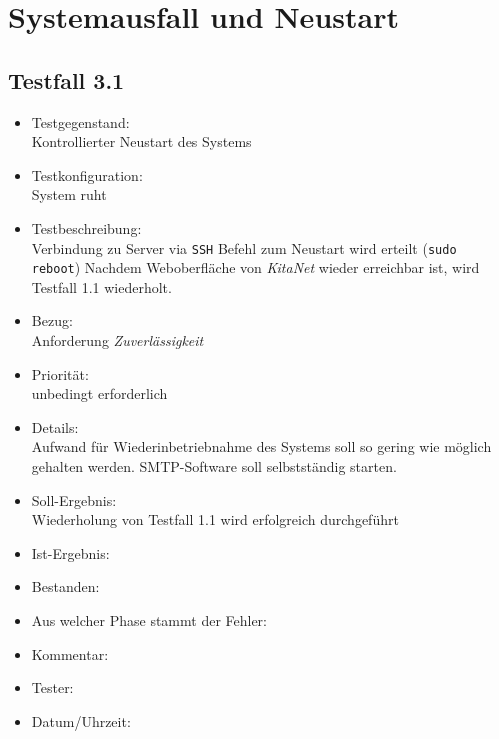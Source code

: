 \section{Systemausfall und Neustart}
\subsection{Testfall 3.1}
\begin{itemize}
	\item Testgegenstand:\\
Kontrollierter Neustart des Systems
	\item Testkonfiguration:\\
	System ruht
	\item Testbeschreibung:\\
	Verbindung zu Server via \verb+SSH+
	Befehl zum Neustart wird erteilt (\verb+sudo reboot+)
	Nachdem Weboberfläche von \textit{KitaNet} wieder erreichbar ist, wird Testfall 1.1 wiederholt.
	\item Bezug:\\
	Anforderung \textit{Zuverlässigkeit}
	\item Priorität:\\
	unbedingt erforderlich
	\item Details:\\
	Aufwand für Wiederinbetriebnahme des Systems soll so gering wie möglich gehalten werden. SMTP-Software soll selbstständig starten.
	\item Soll-Ergebnis:\\
	Wiederholung von Testfall 1.1 wird erfolgreich durchgeführt
	\item Ist-Ergebnis:\\
	\item Bestanden:\\
	\item Aus welcher Phase stammt der Fehler:\\
	\item Kommentar:\\
	\item Tester:\\
	\item Datum/Uhrzeit:\\
\end{itemize}

